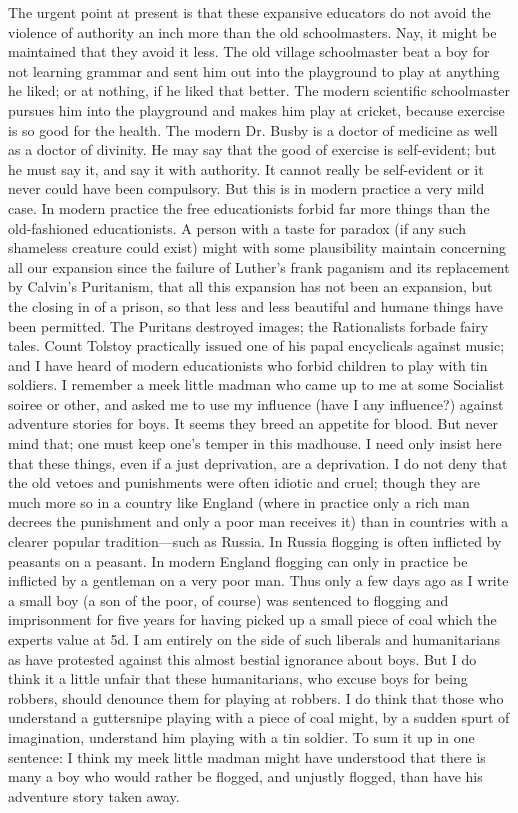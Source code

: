 \documentclass{book}
\begin{document}
The urgent point at present is that these expansive educators do not avoid the violence of authority an inch more than the old schoolmasters. Nay, it might be maintained that they avoid it less. The old village schoolmaster beat a boy for not learning grammar and sent him out into the playground to play at anything he liked; or at nothing, if he liked that better. The modern scientific schoolmaster pursues him into the playground and makes him play at cricket, because exercise is so good for the health. The modern Dr. Busby is a doctor of medicine as well as a doctor of divinity. He may say that the good of exercise is self-evident; but he must say it, and say it with authority. It cannot really be self-evident or it never could have been compulsory. But this is in modern practice a very mild case. In modern practice the free educationists forbid far more things than the old-fashioned educationists. A person with a taste for paradox (if any such shameless creature could exist) might with some plausibility maintain concerning all our expansion since the failure of Luther’s frank paganism and its replacement by Calvin’s Puritanism, that all this expansion has not been an expansion, but the closing in of a prison, so that less and less beautiful and humane things have been permitted. The Puritans destroyed images; the Rationalists forbade fairy tales. Count Tolstoy practically issued one of his papal encyclicals against music; and I have heard of modern educationists who forbid children to play with tin soldiers. I remember a meek little madman who came up to me at some Socialist soiree or other, and asked me to use my influence (have I any influence?) against adventure stories for boys. It seems they breed an appetite for blood. But never mind that; one must keep one’s temper in this madhouse. I need only insist here that these things, even if a just deprivation, are a deprivation. I do not deny that the old vetoes and punishments were often idiotic and cruel; though they are much more so in a country like England (where in practice only a rich man decrees the punishment and only a poor man receives it) than in countries with a clearer popular tradition—such as Russia. In Russia flogging is often inflicted by peasants on a peasant. In modern England flogging can only in practice be inflicted by a gentleman on a very poor man. Thus only a few days ago as I write a small boy (a son of the poor, of course) was sentenced to flogging and imprisonment for five years for having picked up a small piece of coal which the experts value at 5d. I am entirely on the side of such liberals and humanitarians as have protested against this almost bestial ignorance about boys. But I do think it a little unfair that these humanitarians, who excuse boys for being robbers, should denounce them for playing at robbers. I do think that those who understand a guttersnipe playing with a piece of coal might, by a sudden spurt of imagination, understand him playing with a tin soldier. To sum it up in one sentence: I think my meek little madman might have understood that there is many a boy who would rather be flogged, and unjustly flogged, than have his adventure story taken away.
\end{document}
